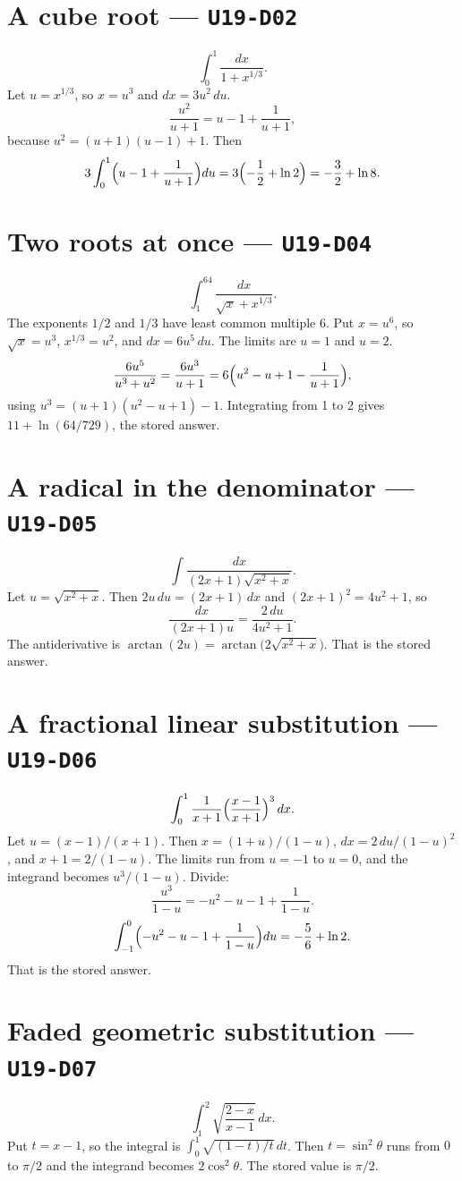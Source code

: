 \section{A cube root --- \texttt{U19-D02}}
\[
\int_0^1\frac{dx}{1+x^{1/3}}.
\]
Let $u=x^{1/3}$, so $x=u^3$ and $dx=3u^2\,du$.
\[
\frac{u^2}{u+1}=u-1+\frac{1}{u+1},
\]
because $u^2=(u+1)(u-1)+1$. Then
\[
3\int_0^1\Bigl(u-1+\frac{1}{u+1}\Bigr)du=3\Bigl(-\frac12+\ln 2\Bigr)=-\frac32+\ln 8.
\]

\section{Two roots at once --- \texttt{U19-D04}}
\[
\int_1^{64}\frac{dx}{\sqrt{x}+x^{1/3}}.
\]
The exponents $1/2$ and $1/3$ have least common multiple $6$. Put $x=u^6$, so $\sqrt{x}=u^3$, $x^{1/3}=u^2$, and $dx=6u^5\,du$. The limits are $u=1$ and $u=2$.
\[
\frac{6u^5}{u^3+u^2}=\frac{6u^3}{u+1}=6\Bigl(u^2-u+1-\frac{1}{u+1}\Bigr),
\]
using $u^3=(u+1)(u^2-u+1)-1$. Integrating from 1 to 2 gives $11+\ln(64/729)$, the stored answer.

\section{A radical in the denominator --- \texttt{U19-D05}}
\[
\int\frac{dx}{(2x+1)\sqrt{x^2+x}}.
\]
Let $u=\sqrt{x^2+x}$. Then $2u\,du=(2x+1)\,dx$ and $(2x+1)^2=4u^2+1$, so
\[
\frac{dx}{(2x+1)u}=\frac{2\,du}{4u^2+1}.
\]
The antiderivative is $\arctan(2u)=\arctan\bigl(2\sqrt{x^2+x}\bigr)$. That is the stored answer.

\section{A fractional linear substitution --- \texttt{U19-D06}}
\[
\int_0^1\frac{1}{x+1}\Bigl(\frac{x-1}{x+1}\Bigr)^3\,dx.
\]
Let $u=(x-1)/(x+1)$. Then $x=(1+u)/(1-u)$, $dx=2\,du/(1-u)^2$, and $x+1=2/(1-u)$. The limits run from $u=-1$ to $u=0$, and the integrand becomes $u^3/(1-u)$. Divide:
\[
\frac{u^3}{1-u}=-u^2-u-1+\frac{1}{1-u}.
\]
\[
\int_{-1}^{0}\Bigl(-u^2-u-1+\frac{1}{1-u}\Bigr)du=-\frac56+\ln 2.
\]
That is the stored answer.

\section{Faded geometric substitution --- \texttt{U19-D07}}
\[
\int_1^2\sqrt{\frac{2-x}{x-1}}\,dx.
\]
Put $t=x-1$, so the integral is $\int_0^1\sqrt{(1-t)/t}\,dt$. Then $t=\sin^2\theta$ runs from $0$ to $\pi/2$ and the integrand becomes $2\cos^2\theta$. The stored value is $\pi/2$.

